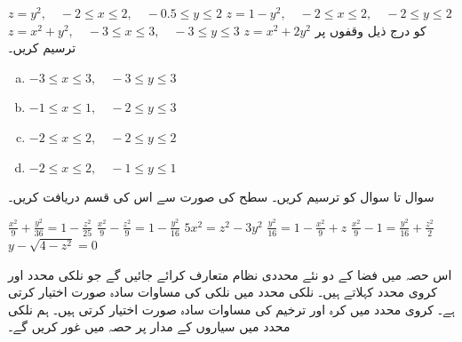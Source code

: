 $z=y^2,\quad -2\le x\le 2,\quad -0.5\le y\le 2$
$z=1-y^2,\quad -2\le x\le 2,\quad -2\le y\le 2$
$z=x^2+y^2,\quad -3\le x\le 3,\quad -3\le y\le 3$
$z=x^2+2y^2$
کو درج ذیل وقفوں پر ترسیم کریں۔
\begin{enumerate}[a.]
\item
$-3\le x\le 3,\quad -3\le y\le 3$
\item
$-1\le x\le 1,\quad -2\le y\le 3$
\item
$-2\le x\le 2,\quad -2\le y\le 2$
\item
$-2\le x\le 2,\quad -1\le y\le 1$
\end{enumerate}
سوال  تا سوال  کو ترسیم کریں۔ سطح کی صورت  سے  اس کی قسم دریافت کریں۔

$\frac{x^2}{9}+\frac{y^2}{36}=1-\frac{z^2}{25}$
$\frac{x^2}{9}-\frac{z^2}{9}=1-\frac{y^2}{16}$
$5x^2=z^2-3y^2$
$\frac{y^2}{16}=1-\frac{x^2}{9}+z$
$\frac{x^2}{9}-1=\frac{y^2}{16}+\frac{z^2}{2}$
$y-\sqrt{4-z^2}=0$


اس حصہ میں فضا کے دو نئے محددی نظام متعارف کرائے جائیں گے جو نلکی محدد اور کروی محدد کہلاتے ہیں۔ نلکی محدد میں نلکی  کی مساوات سادہ صورت اختیار کرتی ہے۔ کروی محدد میں کرہ اور ترخیم کی مساوات سادہ صورت اختیار کرتی  ہیں۔ ہم   نلکی محدد میں سیاروں کے مدار پر حصہ  میں غور کریں گے۔

